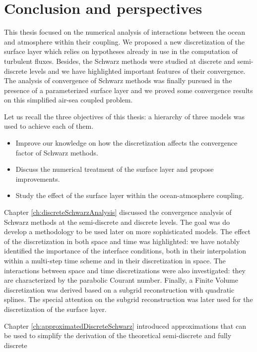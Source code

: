 \chapter*{Conclusion and perspectives}
\label{ch:conclusion}
This thesis focused on the numerical analysis of interactions between
the ocean and atmosphere within their coupling. We proposed a
new discretization of the surface layer which relies on
hypotheses already in use in the computation of turbulent fluxes.
Besides, the Schwarz methods were studied at discrete and
semi-discrete levels and we have highlighted important features
of their convergence. The analysis of convergence of Schwarz methods
was finally pursued
in the presence of a parameterized surface layer and we
proved some convergence results on this simplified air-sea coupled
problem.
\par
Let us recall the three objectives of this thesis:
a hierarchy of three models was used to achieve each of them.
\begin{itemize}
\item Improve our knowledge on how the discretization affects
the convergence factor of Schwarz methods.
\item Discuss the numerical treatment of the surface layer
	and propose improvements.
\item Study the effect of the surface layer within
	the ocean-atmosphere coupling.
\end{itemize}
\par
Chapter \ref{ch:discreteSchwarzAnalysis} discussed the convergence
analysis of Schwarz methods at the semi-discrete and discrete
levels.
The goal was do develop a methodology to be used later
on more sophisticated models.
The effect of the discretization in both
space and time was highlighted: we have notably identified
the importance of the interface conditions,
both in their interpolation within a multi-step time scheme
and in their discretization in space.
The interactions between space and time discretizations
were also investigated: they are characterized by the
parabolic Courant number.
Finally, a Finite Volume discretization was derived based
on a subgrid reconstruction with quadratic splines.
The special attention on the subgrid reconstruction
was later used for the discretization of the surface layer.
\par
Chapter \ref{ch:approximatedDiscreteSchwarz} introduced
approximations that can be used to simplify the derivation
of the theoretical semi-discrete and fully discrete
